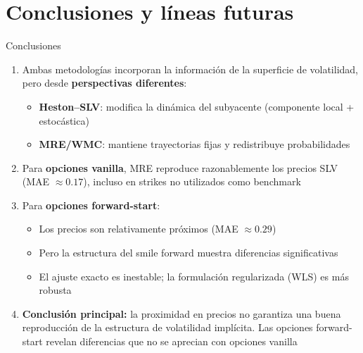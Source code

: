 \documentclass[8pt]{beamer}
\begin{document}
\section{Conclusiones y líneas futuras}

\begin{frame}{Conclusiones}
    \begin{enumerate}
        \item Ambas metodologías incorporan la información de la superficie de volatilidad, pero desde \textbf{perspectivas diferentes}:
        \begin{itemize}
            \item \textbf{Heston--SLV}: modifica la dinámica del subyacente (componente local + estocástica)
            \item \textbf{MRE/WMC}: mantiene trayectorias fijas y redistribuye probabilidades
        \end{itemize}
        \pause
        
        \item Para \textbf{opciones vanilla}, MRE reproduce razonablemente los precios SLV (MAE $\approx 0.17$), incluso en strikes no utilizados como benchmark
        \pause
        
        \item Para \textbf{opciones forward-start}:
        \begin{itemize}
            \item Los precios son relativamente próximos (MAE $\approx 0.29$)
            \item Pero la estructura del smile forward muestra diferencias significativas
            \item El ajuste exacto es inestable; la formulación regularizada (WLS) es más robusta
        \end{itemize}
        \pause
        
        \item \textbf{Conclusión principal:} la proximidad en precios no garantiza una buena reproducción de la estructura de volatilidad implícita. Las opciones forward-start revelan diferencias que no se aprecian con opciones vanilla
    \end{enumerate}
\end{frame}
\end{document}
